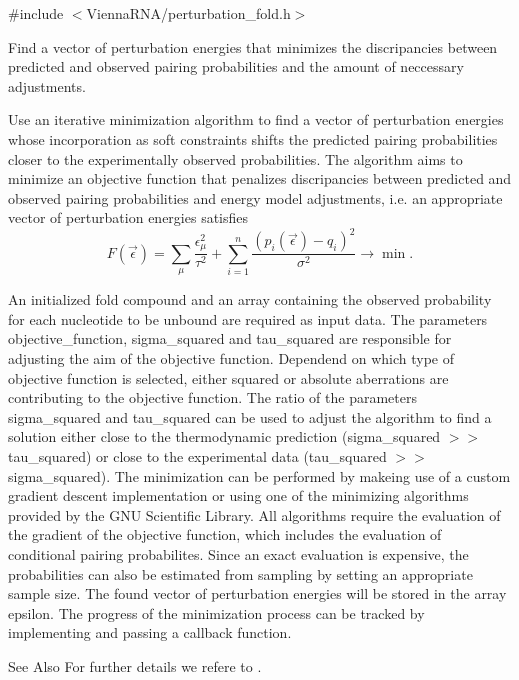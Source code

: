 {\ttfamily \#include $<$Vienna\-R\-N\-A/perturbation\-\_\-fold.\-h$>$}



Find a vector of perturbation energies that minimizes the discripancies between predicted and observed pairing probabilities and the amount of neccessary adjustments. 

Use an iterative minimization algorithm to find a vector of perturbation energies whose incorporation as soft constraints shifts the predicted pairing probabilities closer to the experimentally observed probabilities. The algorithm aims to minimize an objective function that penalizes discripancies between predicted and observed pairing probabilities and energy model adjustments, i.\-e. an appropriate vector of perturbation energies satisfies \[ F(\vec\epsilon) = \sum_{\mu}{ \frac{\epsilon_{\mu}^2}{\tau^2} } + \sum_{i = 1}^n{ \frac{(p_i(\vec\epsilon) - q_i)^2}{\sigma^2} } \to \min. \]

An initialized fold compound and an array containing the observed probability for each nucleotide to be unbound are required as input data. The parameters objective\-\_\-function, sigma\-\_\-squared and tau\-\_\-squared are responsible for adjusting the aim of the objective function. Dependend on which type of objective function is selected, either squared or absolute aberrations are contributing to the objective function. The ratio of the parameters sigma\-\_\-squared and tau\-\_\-squared can be used to adjust the algorithm to find a solution either close to the thermodynamic prediction (sigma\-\_\-squared $>$$>$ tau\-\_\-squared) or close to the experimental data (tau\-\_\-squared $>$$>$ sigma\-\_\-squared). The minimization can be performed by makeing use of a custom gradient descent implementation or using one of the minimizing algorithms provided by the G\-N\-U Scientific Library. All algorithms require the evaluation of the gradient of the objective function, which includes the evaluation of conditional pairing probabilites. Since an exact evaluation is expensive, the probabilities can also be estimated from sampling by setting an appropriate sample size. The found vector of perturbation energies will be stored in the array epsilon. The progress of the minimization process can be tracked by implementing and passing a callback function.

\begin{DoxySeeAlso}{See Also}
For further details we refere to \cite{washietl:2012}.
\end{DoxySeeAlso}

